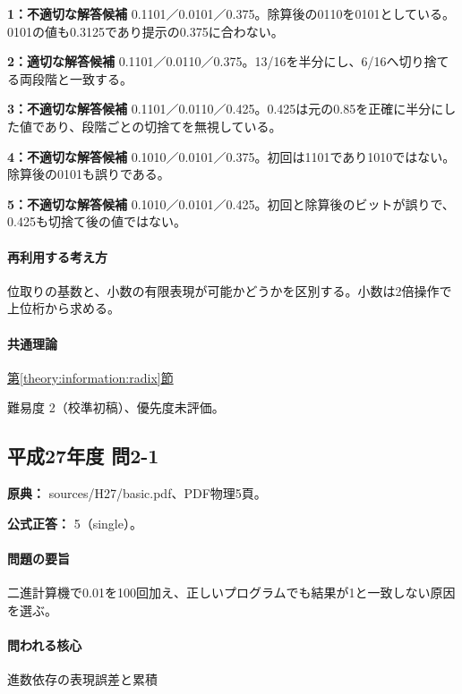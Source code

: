 \noindent\textbf{1：不適切な解答候補} 0.1101／0.0101／0.375。除算後の0110を0101としている。0101の値も0.3125であり提示の0.375に合わない。\par

\noindent\textbf{2：適切な解答候補} 0.1101／0.0110／0.375。13/16を半分にし、6/16へ切り捨てる両段階と一致する。\par

\noindent\textbf{3：不適切な解答候補} 0.1101／0.0110／0.425。0.425は元の0.85を正確に半分にした値であり、段階ごとの切捨てを無視している。\par

\noindent\textbf{4：不適切な解答候補} 0.1010／0.0101／0.375。初回は1101であり1010ではない。除算後の0101も誤りである。\par

\noindent\textbf{5：不適切な解答候補} 0.1010／0.0101／0.425。初回と除算後のビットが誤りで、0.425も切捨て後の値ではない。\par

\paragraph{再利用する考え方} 位取りの基数と、小数の有限表現が可能かどうかを区別する。小数は2倍操作で上位桁から求める。

\paragraph{共通理論} \hyperref[theory:information:radix]{第\ref*{theory:information:radix}節}

\par 難易度 2（校準初稿）、優先度未評価。

\subsection{平成27年度 問2-1}
\label{q:h27-reg-basic-2-1}

\noindent\textbf{原典：} sources/H27/basic.pdf、PDF物理5頁。

\textbf{公式正答：} 5（single）。

\paragraph{問題の要旨} 二進計算機で0.01を100回加え、正しいプログラムでも結果が1と一致しない原因を選ぶ。

\paragraph{問われる核心} 進数依存の表現誤差と累積

